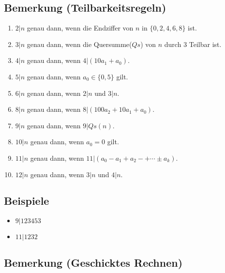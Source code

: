 	
\subsection[Teilbarkeitsregeln]{Bemerkung (Teilbarkeitsregeln)}	

	\begin{enumerate}
	
	\item $2|n$ genau dann, wenn die Endziffer von $n$ in $\{0,2,4,6,8\} $ ist.
	\item $3|n$ genau dann, wenn die Quersumme($Qs$) von $n$ durch 3 Teilbar ist.
	\item $4|n$ genau dann, wenn $4|(10a_1+a_0)$.
	\item $5|n$ genau dann, wenn $a_0 \in \{0,5\}$ gilt.
	\item $6|n$ genau dann, wenn $2|n$ und $3|n$.
	\item $8|n$ genau dann, wenn $8|(100a_2+10a_1+a_0)$.
	\item $9|n$ genau dann, wenn $9|Qs(n)$.
	\item $10|n$ genau dann, wenn $a_0=0$ gilt.
	\item $11|n$ genau dann, wenn $11|(a_0-a_1+a_2-+\cdots \pm a_k)$.
	\item $12|n$ genau dann, wenn $3|n$ und $4|n$.
	
	\end{enumerate}


\subsection{Beispiele}

	 \begin{itemize}
	 
	 \item $9|123453$
	 \item $11|1232$
	 
	 \end{itemize}


\subsection[Geschicktes Rechnen]{Bemerkung (Geschicktes Rechnen)}

